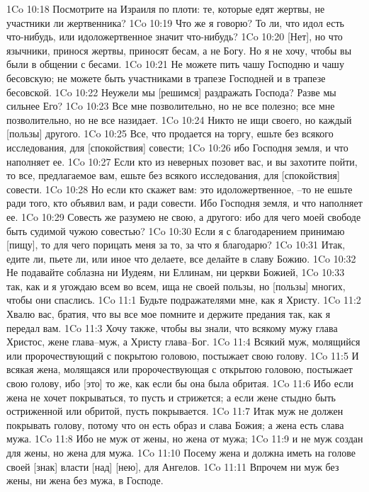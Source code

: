 1Co 10:18  Посмотрите на Израиля по плоти: те, которые едят жертвы, не участники ли жертвенника?
1Co 10:19  Что же я говорю? То ли, что идол есть что-нибудь, или идоложертвенное значит что-нибудь?
1Co 10:20  [Нет], но что язычники, принося жертвы, приносят бесам, а не Богу. Но я не хочу, чтобы вы были в общении с бесами.
1Co 10:21  Не можете пить чашу Господню и чашу бесовскую; не можете быть участниками в трапезе Господней и в трапезе бесовской.
1Co 10:22  Неужели мы [решимся] раздражать Господа? Разве мы сильнее Его?
1Co 10:23  Все мне позволительно, но не все полезно; все мне позволительно, но не все назидает.
1Co 10:24  Никто не ищи своего, но каждый [пользы] другого.
1Co 10:25  Все, что продается на торгу, ешьте без всякого исследования, для [спокойствия] совести;
1Co 10:26  ибо Господня земля, и что наполняет ее.
1Co 10:27  Если кто из неверных позовет вас, и вы захотите пойти, то все, предлагаемое вам, ешьте без всякого исследования, для [спокойствия] совести.
1Co 10:28  Но если кто скажет вам: это идоложертвенное, --то не ешьте ради того, кто объявил вам, и ради совести. Ибо Господня земля, и что наполняет ее.
1Co 10:29  Совесть же разумею не свою, а другого: ибо для чего моей свободе быть судимой чужою совестью?
1Co 10:30  Если я с благодарением принимаю [пищу], то для чего порицать меня за то, за что я благодарю?
1Co 10:31  Итак, едите ли, пьете ли, или иное что делаете, все делайте в славу Божию.
1Co 10:32  Не подавайте соблазна ни Иудеям, ни Еллинам, ни церкви Божией,
1Co 10:33  так, как и я угождаю всем во всем, ища не своей пользы, но [пользы] многих, чтобы они спаслись.
1Co 11:1  Будьте подражателями мне, как я Христу.
1Co 11:2  Хвалю вас, братия, что вы все мое помните и держите предания так, как я передал вам.
1Co 11:3  Хочу также, чтобы вы знали, что всякому мужу глава Христос, жене глава--муж, а Христу глава--Бог.
1Co 11:4  Всякий муж, молящийся или пророчествующий с покрытою головою, постыжает свою голову.
1Co 11:5  И всякая жена, молящаяся или пророчествующая с открытою головою, постыжает свою голову, ибо [это] то же, как если бы она была обритая.
1Co 11:6  Ибо если жена не хочет покрываться, то пусть и стрижется; а если жене стыдно быть остриженной или обритой, пусть покрывается.
1Co 11:7  Итак муж не должен покрывать голову, потому что он есть образ и слава Божия; а жена есть слава мужа.
1Co 11:8  Ибо не муж от жены, но жена от мужа;
1Co 11:9  и не муж создан для жены, но жена для мужа.
1Co 11:10  Посему жена и должна иметь на голове своей [знак] власти [над] [нею], для Ангелов.
1Co 11:11  Впрочем ни муж без жены, ни жена без мужа, в Господе.
